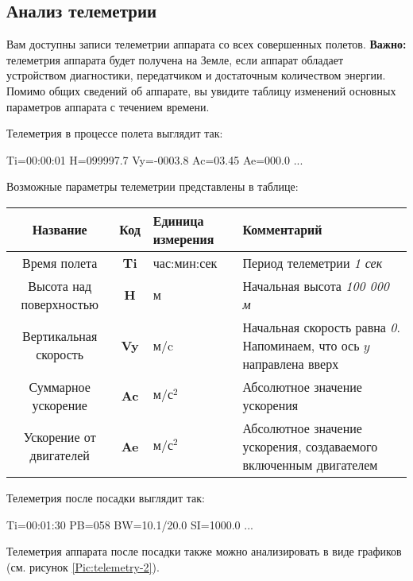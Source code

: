 \documentclass[12pt,a4paper]{article}
\begin{document}
\subsection{Анализ телеметрии}

Вам доступны записи телеметрии аппарата со всех совершенных полетов. \textbf{Важно:} телеметрия
аппарата будет получена на Земле, если аппарат обладает устройством диагностики,
передатчиком и достаточным количеством энергии. Помимо общих сведений об аппарате, вы
увидите таблицу изменений основных параметров аппарата с течением времени.

Телеметрия в процессе полета выглядит так:

\begin{verbatim*}
Ti=00:00:01 H=099997.7 Vy=-0003.8 Ac=03.45 Ae=000.0
...
\end{verbatim*}

Возможные параметры телеметрии представлены в таблице:

\begin{center}
\begin{tabular}{ |c|c|p{2.5cm}|p{6cm}| } 
  \hline
  \textbf{Название} & \textbf{Код} & \textbf{Единица измерения} & \textbf{Комментарий} \\
  \hline
  Время полета & \textbf{Ti} & час:мин:сек & Период телеметрии \emph{1 сек}\\
  \hline
  Высота над поверхностью & \textbf{H} & м & Начальная высота \emph{100 000 м}\\
  \hline
  Вертикальная скорость & \textbf{Vy} & м/c & Начальная скорость равна
  \emph{0}. Напоминаем, что ось $y$ направлена вверх\\
  \hline
  Суммарное ускорение & \textbf{Ac} & $\text{м}/\text{с}^{2}$ & Абсолютное значение ускорения\\
  \hline
  Ускорение от двигателей & \textbf{Ae} & $\text{м}/\text{с}^{2}$ & Абсолютное значение ускорения,
  создаваемого включенным двигателем\\
  \hline
\end{tabular}
\end{center}

Телеметрия после посадки выглядит так:

\begin{verbatim*}
Ti=00:01:30 PB=058 BW=10.1/20.0 SI=1000.0
...
\end{verbatim*}

Телеметрия аппарата после посадки также можно анализировать в виде графиков (см. рисунок
\ref{Pic:telemetry-2}).
\end{document}
